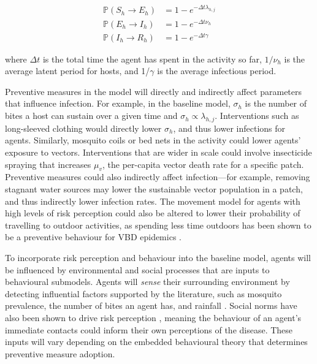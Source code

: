 \begin{equation} \label{eq:agents}
    \begin{aligned}
    \mathbb{P}(S_h\to E_h)&=1-e^{-\Delta t \lambda_{h,j}} \\
    \mathbb{P}(E_h\to I_h)&=1-e^{-\Delta t \nu_h} \\
    \mathbb{P}(I_h\to R_h)&=1-e^{-\Delta t \gamma}
    \end{aligned}
\end{equation}

where $\Delta t$ is the total time the agent has spent in the activity so far, $1/\nu_h$ is the average latent period for hosts, and 1/$\gamma$ is the average infectious period.

Preventive measures in the model will directly and indirectly affect parameters that influence infection. For example, in the baseline model, $\sigma_h$ is the number of bites a host can sustain over a given time and $\sigma_h\propto\lambda_{h,j}$. Interventions such as long-sleeved clothing would directly lower $\sigma_h$, and thus lower infections for agents. Similarly, mosquito coils or bed nets in the  activity could lower agents' exposure to vectors. Interventions that are wider in scale could involve insecticide spraying that increases $\mu_v$, the per-capita vector death rate for a specific patch. Preventive measures could also indirectly affect infection---for example, removing stagnant water sources may lower the sustainable vector population in a patch, and thus indirectly lower infection rates. The movement model for agents with high levels of risk perception could also be altered to lower their probability of travelling to outdoor activities, as spending less time outdoors has been shown to be a preventive behaviour for VBD epidemics \cite{duval_how_2022}.

To incorporate risk perception and behaviour into the baseline model, agents will be influenced by environmental and social processes that are inputs to behavioural submodels. Agents will \textit{sense} their surrounding environment by detecting influential factors supported by the literature, such as mosquito prevalence, the number of bites an agent has, and rainfall \cite{raude_public_2012, lopes-rafegas_contribution_2023}. Social norms have also been shown to drive risk perception \cite{lopes-rafegas_contribution_2023}, meaning the behaviour of an agent's immediate contacts could inform their own perceptions of the disease. These inputs will vary depending on the embedded behavioural theory that determines preventive measure adoption.

